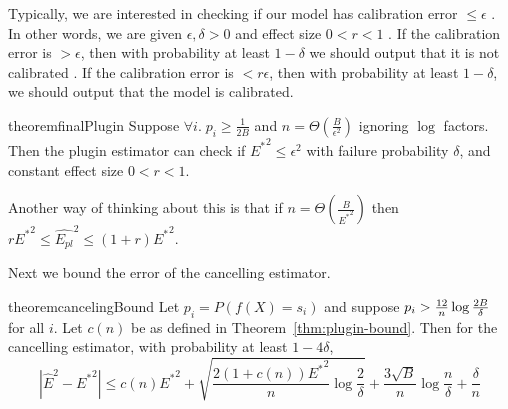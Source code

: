 Typically, we are interested in checking if our model has calibration error $\leq \epsilon$ .  In other words, we are given $\epsilon, \delta > 0$ and effect size $0 < r < 1$ . If the calibration error is $> \epsilon$, then with probability at least $1 - \delta$ we should output that it is not calibrated . If the calibration error is $< r\epsilon$, then with probability at least $1 - \delta$, we should output that the model is calibrated.

\begin{restatable}{theorem}{finalPlugin}
\label{thm:final-plugin}
  Suppose  $\forall i.\;p_i \geq \frac{1}{2B}$ and $n = \Theta(\frac{B}{\epsilon^2})$ ignoring $\log$ factors. Then the plugin estimator can check if ${E^*}^2 \leq \epsilon^2$ with failure probability $\delta$, and constant effect size $0 < r < 1$. 
\end{restatable}

Another way of thinking about this is that if $n = \Theta(\frac{B}{{E^*}^2})$ then  $r {E^*}^2 \leq \hat{E_{pl}}^2 \leq (1+r){E^*}^2$.

Next we bound the error of the cancelling estimator.


\begin{restatable}{theorem}{cancelingBound}
\label{thm:our-bound}
Let $p_i = P(f(X) = s_i)$ and suppose $p_i > \frac{12}{n}\log{\frac{2B}{\delta}}{}$ for all $i$. Let $c(n)$ be as defined in Theorem~\ref{thm:plugin-bound}. 
Then for the cancelling estimator, with probability at least $1 - 4\delta$,
\[ | \hat{E}^2 - {E^*}^2 | \leq c(n){E^*}^2 + \sqrt{\frac{2(1+c(n)){E^*}^2}{n} \log{\frac{2}{\delta}}} + \frac{3\sqrt{B}}{n} \log{\frac{n}{\delta}} + \frac{\delta}{n}\]
\end{restatable}

